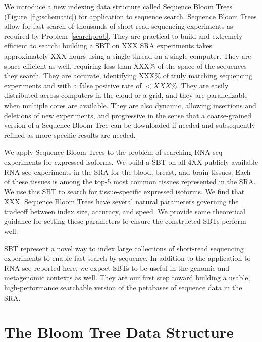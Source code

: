 \documentclass[11pt]{article}
\begin{document}

We introduce a new indexing data structure called Sequence Bloom Trees (Figure~\ref{fig:schematic}) for application to sequence search. Sequence Bloom Trees allow for fast search of thousands of short-read sequencing experiments as required by Problem~\ref{searchprob}. They are practical to build and extremely efficient to search: building a SBT on XXX SRA experiments takes approximately XXX hours using a single thread on a single computer.  They are space efficient as well, requiring less than XXX\% of the space of the sequences they search. They are accurate, identifying XXX\% of truly matching sequencing experiments and with a false positive rate of $< XXX$\%.  They are easily distributed across computers in the cloud or a grid, and they are parallelizable when multiple cores are available. They are also dynamic, allowing insertions and deletions of new experiments, and progressive in the sense that a coarse-grained version of a Sequence Bloom Tree can be downloaded if needed and subsequently refined as more specific results are needed.

We apply Sequence Bloom Trees to the problem of searching RNA-seq experiments for expressed isoforms. We build a SBT on  all 4XX publicly available RNA-seq experiments in the SRA for the blood, breast, and brain tissues. Each of these tissues is among the top-5 most common tissues represented in the SRA. We use this SBT to search for tissue-specific expressed isoforms. We find that XXX. Sequence Bloom Trees have several natural parameters governing the tradeoff between index size, accuracy, and speed. We provide some theoretical guidance for setting these parameters to ensure the constructed SBTs perform well.

SBT represent a novel way to index large collections of short-read sequencing experiments to enable fast search by sequence. In addition to the application to RNA-seq reported here, we expect SBTs to be useful in the genomic and metagenomic contexts as well. They are our first step toward building a usable, high-performance searchable version of the petabases of sequence data in the SRA.

\section{The Bloom Tree Data Structure}
\end{document}
